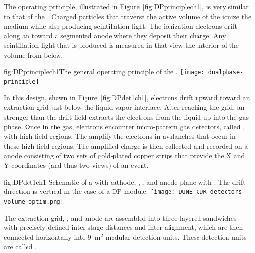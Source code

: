 The  operating principle, illustrated in Figure~\ref{fig:DPprinciplech1}, is very similar to that of the . %
 Charged particles that traverse the active volume of the  ionize the medium while also producing scintillation light.  The ionization electrons drift along an \efield toward a segmented anode where they deposit their charge. Any scintillation light that is produced is measured in   that view the interior of the volume from below. 
 
 
\begin{dunefigure}{fig:DPprinciplech1}{The general operating principle of the  .}
\texttt{[image: dualphase-principle]}
\end{dunefigure}

In this design, shown in Figure~\ref{fig:DPdet1ch1}, electrons drift upward toward an extraction grid just below the liquid-vapor interface. 
After reaching the grid, an \efield stronger than the \dpnominaldriftfield{} drift field extracts the electrons from the liquid up into the gas phase. Once in the gas, electrons encounter micro-pattern gas detectors, called , with high-field regions. The  amplify the electrons in avalanches that occur in these high-field regions. The amplified charge is then collected and recorded on a \twod anode
consisting of two sets of %
gold-plated copper strips that provide the X and Y coordinates (and thus two views) of an event. 

\begin{dunefigure}{fig:DPdet1ch1}
  {Schematic of a \nominalmodsize {}    with cathode, , , and anode plane with . The drift direction is vertical in the case of a DP module.}
  \texttt{[image: DUNE-CDR-detectors-volume-optim.png]}
\end{dunefigure}

 The extraction grid, , and anode are assembled into three-layered sandwiches with precisely defined inter-stage distances and inter-alignment,  which are then connected horizontally into \num{9}~m$^2$ modular detection units. These detection units are called .

